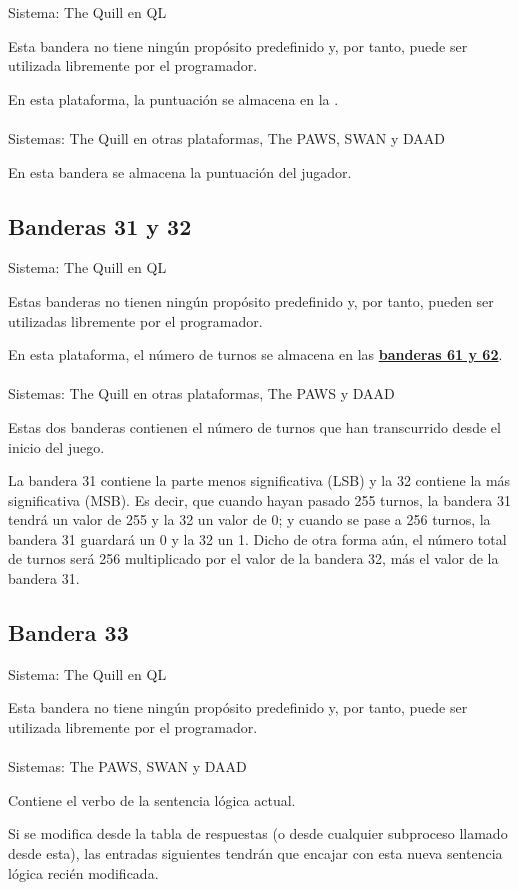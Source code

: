 \documentclass[11pt, a5paper]{article}
\newcommand{\quill}{\textsf{The Quill}\xspace}
\newcommand{\paw}{\textsf{The PAWS}\xspace}
\newcommand{\swan}{\textsf{SWAN}\xspace}
\newcommand{\daad}{\textsf{DAAD}\xspace}
\newcommand{\sistema}[1]{\noindent Sistema: #1 \nopagebreak}
\newcommand{\sistemas}[1]{\noindent Sistemas: #1 \nopagebreak}
\begin{document}
\sistema{\quill en QL}

Esta bandera no tiene ningún propósito predefinido y, por tanto, puede ser utilizada libremente por el programador.

En esta plataforma, la puntuación se almacena en la \textbf{}.
\\\ \\
\sistemas{\quill en otras plataformas, \paw, \swan y \daad}

En esta bandera se almacena la puntuación del jugador.

\subsection{Banderas 31 y 32}

\sistema{\quill en QL}

Estas banderas no tienen ningún propósito predefinido y, por tanto, pueden ser utilizadas libremente por el programador.

En esta plataforma, el número de turnos se almacena en las \hyperref[flag61]{\textbf{banderas 61 y 62}}.
\\\ \\
\sistemas{\quill en otras plataformas, \paw y \daad}

Estas dos banderas contienen el número de turnos que han transcurrido desde el inicio del juego.

La bandera 31 contiene la parte menos significativa (LSB) y la 32 contiene la más significativa (MSB). Es decir, que cuando hayan pasado 255 turnos, la bandera 31 tendrá un valor de 255 y la 32 un valor de 0; y cuando se pase a 256 turnos, la bandera 31 guardará un 0 y la 32 un 1. Dicho de otra forma aún, el número total de turnos será 256 multiplicado por el valor de la bandera 32, más el valor de la bandera 31.

\subsection{Bandera 33}

\sistema{\quill en QL}

Esta bandera no tiene ningún propósito predefinido y, por tanto, puede ser utilizada libremente por el programador.
\\\ \\
\sistemas{\paw, \swan y \daad}

Contiene el verbo de la sentencia lógica actual.

Si se modifica desde la tabla de respuestas (o desde cualquier subproceso llamado desde esta), las entradas siguientes tendrán que encajar con esta nueva sentencia lógica recién modificada.
\end{document}
